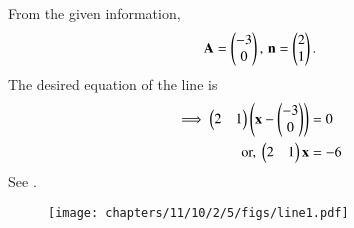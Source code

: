 		From the given information,
\begin{align}		
	\mathbf{A}=\begin{pmatrix}-3\\0\end{pmatrix},\,
\mathbf{n} = \begin{pmatrix}2 \\1\end{pmatrix}.
\end{align}
The desired equation of the line is
\begin{align}
\implies	\begin{pmatrix} 2 & 1 \end{pmatrix} \left( \mathbf{x} - \begin{pmatrix} -3 \\ 0\end{pmatrix}\right) &= 0  \\
	\text{or, }	\begin{pmatrix} 2 & 1\end{pmatrix} \mathbf{x}  &= -6
        \label{eq:chapters/11/10/2/5/1}
\end{align}
See .
\begin{figure}[H]
	\begin{center}
		\texttt{[image: chapters/11/10/2/5/figs/line1.pdf]}
	\end{center}
\caption{}
\label{fig:chapters/11/10/2/5/Fig1}
\end{figure}

